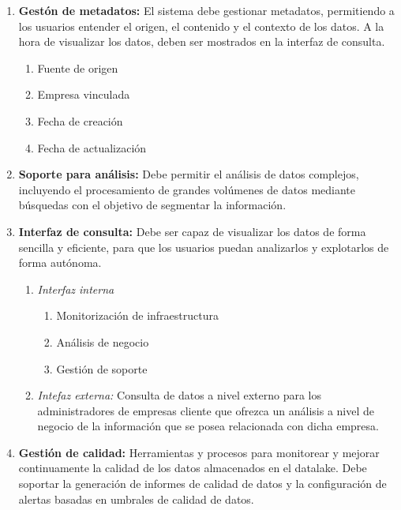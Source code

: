 \begin{enumerate}[label=RF\arabic*.]
	\item \textbf{Gestón de metadatos:} El sistema debe gestionar metadatos, permitiendo a los
		usuarios entender el origen, el contenido y el contexto de los datos. A la hora de
		visualizar los datos, deben ser mostrados en la interfaz de consulta.
		\begin{enumerate}[label*=\arabic*.]
			\item Fuente de origen
			\item Empresa vinculada
			\item Fecha de creación
			\item Fecha de actualización
		\end{enumerate}
	\item \textbf{Soporte para análisis:} Debe permitir el análisis de datos complejos, incluyendo
		el procesamiento de grandes volúmenes de datos mediante búsquedas con el objetivo de segmentar
		la información.
	\item \textbf{Interfaz de consulta:} Debe ser capaz de visualizar los datos de forma sencilla y
		eficiente, para que los usuarios puedan analizarlos y explotarlos de forma autónoma.
		\begin{enumerate}[label*=\arabic*.]
			\item \emph{Interfaz interna}
				\begin{enumerate}[label*=\arabic*.]
					\item Monitorización de infraestructura
					\item Análisis de negocio
					\item Gestión de soporte
				\end{enumerate}
			\item \emph{Intefaz externa:} Consulta de datos a nivel externo para los administradores de
				empresas cliente que ofrezca un análisis a nivel de negocio de la información que se
				posea relacionada con dicha empresa.
		\end{enumerate}
	\item \textbf{Gestión de calidad:} Herramientas y procesos para monitorear y mejorar continuamente
		la calidad de los datos almacenados en el datalake. Debe soportar la generación de informes de
		calidad de datos y la configuración de alertas basadas en umbrales de calidad de datos.
\end{enumerate}

